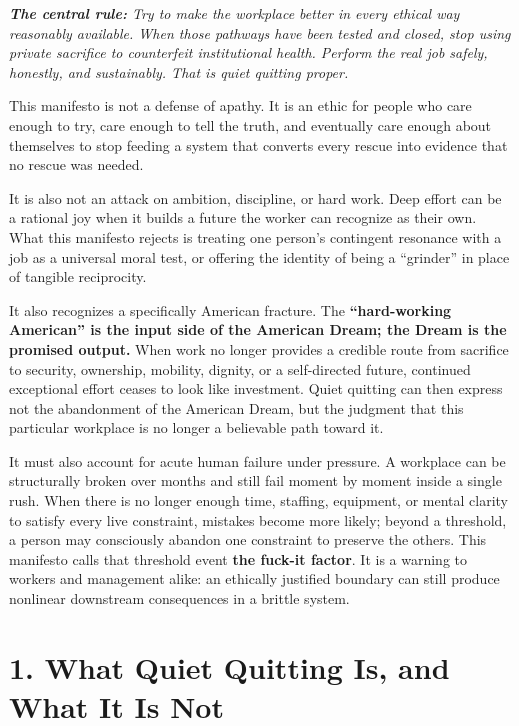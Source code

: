 \documentclass[11pt,oneside]{article}
\renewenvironment{quote}
  {\begin{tcolorbox}[
      enhanced,
      breakable,
      colback=ManifestLight,
      colframe=ManifestRule,
      boxrule=0pt,
      leftrule=3pt,
      arc=0pt,
      outer arc=0pt,
      left=10pt,right=10pt,top=8pt,bottom=8pt,
      before skip=0.8em,after skip=0.8em
    ]\itshape}
  {\end{tcolorbox}}
\begin{document}
\begin{quote}
\textbf{The central rule:} Try to make the workplace better in every
ethical way reasonably available. When those pathways have been tested
and closed, stop using private sacrifice to counterfeit institutional
health. Perform the real job safely, honestly, and sustainably. That is
quiet quitting proper.
\end{quote}

This manifesto is not a defense of apathy. It is an ethic for people who
care enough to try, care enough to tell the truth, and eventually care
enough about themselves to stop feeding a system that converts every
rescue into evidence that no rescue was needed.

It is also not an attack on ambition, discipline, or hard work. Deep
effort can be a rational joy when it builds a future the worker can
recognize as their own. What this manifesto rejects is treating one
person's contingent resonance with a job as a universal moral test, or
offering the identity of being a ``grinder'' in place of tangible
reciprocity.

It also recognizes a specifically American fracture. The
\textbf{``hard-working American'' is the input side of the American
Dream; the Dream is the promised output.} When work no longer provides a
credible route from sacrifice to security, ownership, mobility, dignity,
or a self-directed future, continued exceptional effort ceases to look
like investment. Quiet quitting can then express not the abandonment of
the American Dream, but the judgment that this particular workplace is
no longer a believable path toward it.

It must also account for acute human failure under pressure. A workplace
can be structurally broken over months and still fail moment by moment
inside a single rush. When there is no longer enough time, staffing,
equipment, or mental clarity to satisfy every live constraint, mistakes
become more likely; beyond a threshold, a person may consciously abandon
one constraint to preserve the others. This manifesto calls that
threshold event \textbf{the fuck-it factor}. It is a warning to workers
and management alike: an ethically justified boundary can still produce
nonlinear downstream consequences in a brittle system.

\section{1. What Quiet Quitting Is, and What It Is
Not}\label{what-quiet-quitting-is-and-what-it-is-not}
\end{document}
